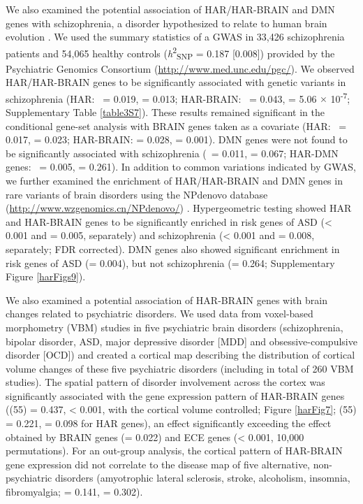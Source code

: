 \begin{refsection}
We also examined the potential association of HAR/HAR-BRAIN and DMN genes with schizophrenia, a disorder hypothesized to relate to human brain evolution \citep{crow1997schizophrenia,Heuvel2019EvolutionaryMI}. We used the summary statistics of a GWAS in 33,426 schizophrenia patients and 54,065 healthy controls (\textit{h}\textsuperscript{2}\textsubscript{SNP} = 0.187 [0.008]) provided by the Psychiatric Genomics Consortium (\url{http://www.med.unc.edu/pgc/}). We observed HAR/HAR-BRAIN genes to be significantly associated with genetic variants in schizophrenia (HAR: \textbeta\ = 0.019, \pval = 0.013; HAR-BRAIN: \textbeta\ = 0.043, \pval = 5.06 $\times$ 10\textsuperscript{-7}; Supplementary Table \ref{table3S7}). These results remained significant in the conditional gene-set analysis with BRAIN genes taken as a covariate (HAR: \textbeta\ = 0.017, \pval = 0.023; HAR-BRAIN: \textbeta = 0.028, \pval = 0.001). DMN genes were not found to be significantly associated with schizophrenia (\textbeta\ = 0.011, \pval = 0.067; HAR-DMN genes: \textbeta\ = 0.005, \pval = 0.261). In addition to common variations indicated by GWAS, we further examined the enrichment of HAR/HAR-BRAIN and DMN genes in rare variants of brain disorders using the NPdenovo database (\url{http://www.wzgenomics.cn/NPdenovo/}) \citep{li2016genes}. Hypergeometric testing showed HAR and HAR-BRAIN genes to be significantly enriched in risk genes of ASD (\pval  < 0.001 and \pval = 0.005, separately) and schizophrenia (\pval < 0.001 and \pval = 0.008, separately; FDR corrected). DMN genes also showed significant enrichment in risk genes of ASD (\pval = 0.004), but not schizophrenia (\pval = 0.264; Supplementary Figure \ref{harFigs9}).

We also examined a potential association of HAR-BRAIN genes with brain changes related to psychiatric disorders. We used data from voxel-based morphometry (VBM) studies in five psychiatric brain disorders (schizophrenia, bipolar disorder, ASD, major depressive disorder [MDD] and obsessive-compulsive disorder [OCD]) and created a cortical map describing the distribution of cortical volume changes of these five psychiatric disorders (including in total of 260 VBM studies). The spatial pattern of disorder involvement across the cortex was significantly associated with the gene expression pattern of HAR-BRAIN genes (\rvaldf(55) = 0.437, \pval < 0.001, with the cortical volume controlled; Figure \ref{harFig7}; \rvaldf(55) = 0.221, \pval = 0.098 for HAR genes), an effect significantly exceeding the effect obtained by BRAIN genes (\pval = 0.022) and ECE genes (\pval < 0.001, 10,000 permutations). For an out-group analysis, the cortical pattern of HAR-BRAIN gene expression did not correlate to the disease map of five alternative, non-psychiatric disorders (amyotrophic lateral sclerosis, stroke, alcoholism, insomnia, fibromyalgia; \rvaldf = 0.141, \pval = 0.302).


\end{refsection}
